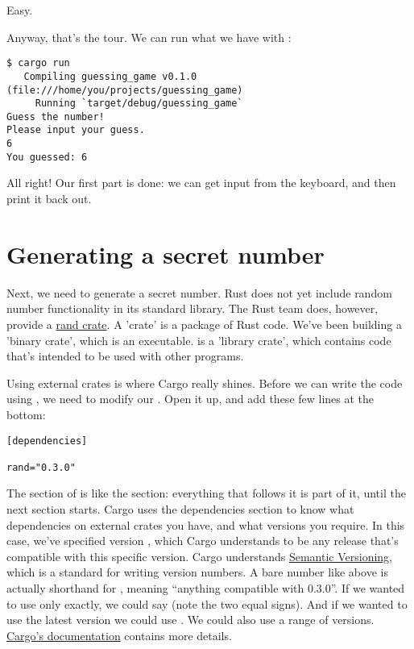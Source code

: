 Easy.

\blank

Anyway, that's the tour. We can run what we have with :

\begin{verbatim}
$ cargo run
   Compiling guessing_game v0.1.0 (file:///home/you/projects/guessing_game)
     Running `target/debug/guessing_game`
Guess the number!
Please input your guess.
6
You guessed: 6
\end{verbatim}

All right! Our first part is done: we can get input from the keyboard, and then print it back out.

\section{Generating a secret number}

Next, we need to generate a secret number. Rust does not yet include random number functionality in its standard library. 
The Rust team does, however, provide a \href{https://crates.io/crates/rand}{rand crate}. A 'crate' is a package of Rust 
code. We've been building a 'binary crate', which is an executable.  is a 'library crate', which contains code 
that's intended to be used with other programs.

\blank

Using external crates is where Cargo really shines. Before we can write the code using , we need to modify our 
. Open it up, and add these few lines at the bottom:

\begin{verbatim}
[dependencies]

rand="0.3.0"
\end{verbatim}

The \code{[dependencies]} section of  is like the \code{[package]} section: everything that follows it is part 
of it, until the next section starts. Cargo uses the dependencies section to know what dependencies on external crates you have, 
and what versions you require. In this case, we've specified version , which Cargo understands to be any release that's
compatible with this specific version. Cargo understands \href{http://semver.org/}{Semantic Versioning}, which is a standard for
writing version numbers. A bare number like above is actually shorthand for , meaning \enquote{anything compatible 
with 0.3.0}. If we wanted to use only  exactly, we could say  (note the two equal signs). And if we
wanted to use the latest version we could use \code{*}. We could also use a range of versions. 
\href{http://doc.crates.io/crates-io.html}{Cargo's documentation} contains more details.


